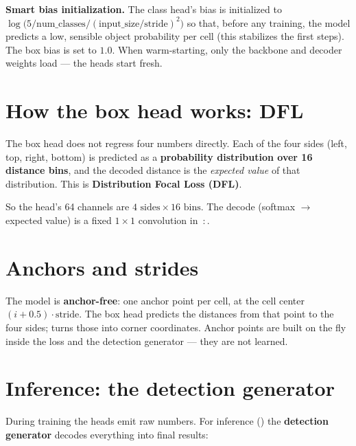 \begin{hood}
\textbf{Smart bias initialization.} The class head's bias is initialized to
$\log\!\big(5 / \text{num\_classes} / (\text{input\_size}/\text{stride})^2\big)$ so that,
before any training, the model predicts a low, sensible object probability per cell (this
stabilizes the first steps). The box bias is set to $1.0$. When warm-starting, only the
backbone and decoder weights load --- the heads start fresh.
\end{hood}

\section{How the box head works: DFL}
The box head does not regress four numbers directly. Each of the four sides
(left, top, right, bottom) is predicted as a \textbf{probability distribution over 16
distance bins}, and the decoded distance is the \emph{expected value} of that distribution.
This is \textbf{Distribution Focal Loss (DFL)}.


\noindent So the  head's 64 channels are $4 \text{ sides} \times 16 \text{ bins}$.
The decode (softmax $\rightarrow$ expected value) is a fixed $1\times1$ convolution in
\,:\,.

\section{Anchors and strides}
The model is \textbf{anchor-free}: one anchor point per cell, at the cell center
$(i+0.5)\cdot\text{stride}$. The box head predicts the distances from that point to the
four sides;  turns those into corner coordinates. Anchor points are built
on the fly inside the loss and the detection generator --- they are not learned.

\section{Inference: the detection generator}
During training the heads emit raw numbers. For inference () the
\textbf{detection generator} decodes everything into final results:

